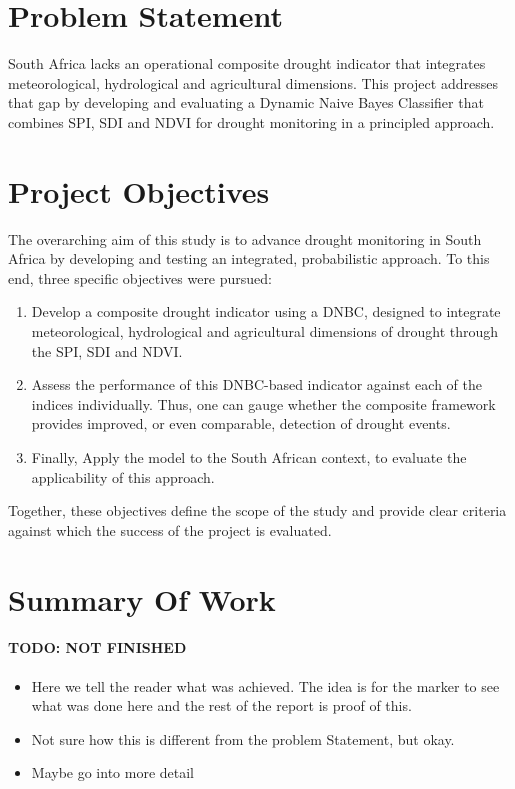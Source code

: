 \section{Problem Statement}

South Africa lacks an operational composite drought indicator that integrates meteorological, hydrological and agricultural dimensions. This project addresses that gap by developing and evaluating a Dynamic Naive Bayes Classifier that combines SPI, SDI and NDVI for drought monitoring in a principled approach.

\section{Project Objectives}

The overarching aim of this study is to advance drought monitoring in South Africa by developing and testing an integrated, probabilistic approach. To this end, three specific objectives were pursued:
\begin{enumerate}
    \item Develop a composite drought indicator using a DNBC, designed to integrate meteorological, hydrological and agricultural dimensions of drought through the SPI, SDI and NDVI. 
    \item Assess the performance of this DNBC-based indicator against each of the indices individually. Thus, one can gauge whether the composite framework provides improved, or even comparable, detection of drought events. 
    \item Finally, Apply the model to the South African context, to evaluate the applicability of this approach. \end{enumerate}

Together, these objectives define the scope of the study and provide clear criteria against which the success of the project is evaluated.

\section{Summary Of Work}

\paragraph{TODO: NOT FINISHED}

\begin{itemize}
    \item Here we tell the reader what was achieved. The idea is for the marker to see what was done here and the rest of the report is proof of this. 
    \item Not sure how this is different from the problem Statement, but okay.
    \item Maybe go into more detail
\end{itemize}

